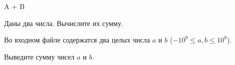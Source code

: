 \begin{problem}{A + B}

Даны два числа. Вычислите их сумму.

\InputFile

Во входном файле содержатся два целых числа $a$ и $b$ ($-10^9 \le a, b \le 10^9$).

\OutputFile

Выведите сумму чисел $a$ и $b$.

\end{problem}
